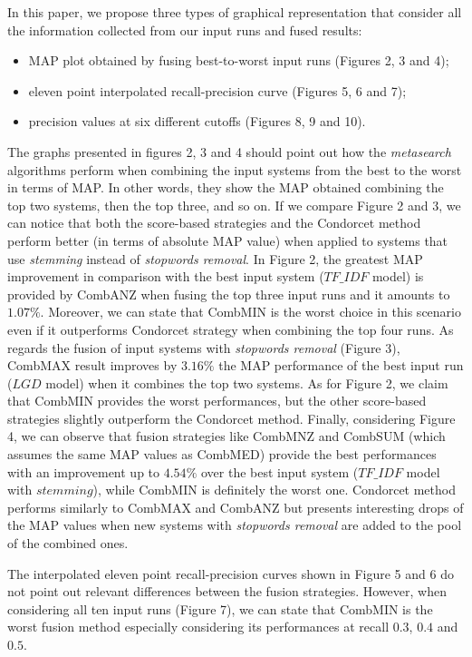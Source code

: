 \documentclass[letterpaper, 10 pt, conference]{ieeeconf}  %
\begin{document}
In this paper, we propose three types of graphical representation that consider all the information collected from our input runs and fused results:
\begin{itemize}
\item MAP plot obtained by fusing best-to-worst input runs (Figures 2, 3 and 4);
\item eleven point interpolated recall-precision curve (Figures 5, 6 and 7);
\item precision values at six different cutoffs (Figures 8, 9 and 10).
\end{itemize}



The graphs presented in figures 2, 3 and 4 should point out how the \textit{metasearch} algorithms perform when combining the input systems from the best to the worst in terms of MAP. In other words, they show the MAP obtained combining the top two systems, then the top
three, and so on. If we compare Figure 2 and 3, we can notice that both the score-based strategies and the Condorcet method perform better (in terms of absolute MAP value) when applied to systems that use \textit{stemming} instead of \textit{stopwords removal}. In Figure 2, the greatest MAP improvement in comparison with the best input system ($TF\_IDF$ model) is provided by CombANZ when fusing the top three input runs and it amounts to $1.07\%$. Moreover, we can state that CombMIN is the worst choice in this scenario even if it outperforms Condorcet strategy when combining the top four runs. As regards the fusion of input systems with \textit{stopwords removal} (Figure 3), CombMAX result improves by $3.16\%$ the MAP performance of the best input run ($LGD$ model) when it combines the top two systems. As for Figure 2, we claim that CombMIN provides the worst performances, but the other score-based strategies slightly outperform the Condorcet method. Finally, considering Figure 4, we can observe that fusion strategies like CombMNZ and CombSUM (which assumes the same MAP values as CombMED) provide the best performances with an improvement up to $4.54\%$ over the best input system ($TF\_IDF$ model with $stemming$), while CombMIN is definitely the worst one. Condorcet method performs similarly to CombMAX and CombANZ but presents interesting drops of the MAP values when new systems with \textit{stopwords removal} are added to the pool of the combined ones. 

The interpolated eleven point recall-precision curves shown in Figure 5 and 6 do not point out relevant differences between the fusion strategies. However, when considering all ten input runs (Figure 7), we can state that CombMIN is the worst fusion method especially considering its performances at recall $0.3$, $0.4$ and $0.5$.
\end{document}
